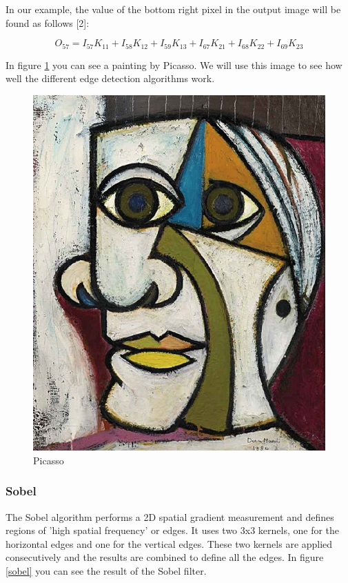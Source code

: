 \documentclass[12pt]{article}
\begin{document}
In our example, the value of the bottom right pixel in the output image will be found as follows [2]:

\begin{equation}
O_{57} = I_{57}K_{11} + I_{58}K_{12} + I_{59}K_{13} + I_{67}K_{21} + I_{68}K_{22} + I_{69}K_{23}
\end{equation}
\newpage

In figure \ref{picasso} you can see a painting by Picasso. We will use this image to see how well the different edge detection algorithms work.

\begin{figure}[h]
\centering
\includegraphics[scale = 0.39]{img/picasso}
\caption{Picasso}
\label{picasso}
\end{figure}

\subsubsection{Sobel}

 The Sobel algorithm performs a 2D spatial gradient measurement and defines regions of 'high spatial frequency' or edges. It uses two 3x3 kernels, one for the horizontal edges and one for the vertical edges. These two kernels are applied consecutively and the results are combined to define all the edges. In figure \ref{sobel} you can see the result of the Sobel filter.
 \newline
\end{document}
